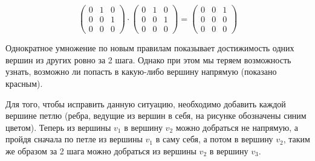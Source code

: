 \documentclass[russian]{lecture-notes}
\begin{document}
$$\begin{pmatrix}
  0 & 1 & 0\\
  0 & 0 & 1\\
  0 & 0 & 0
\end{pmatrix}
\cdot
\begin{pmatrix}
  0 & 1 & 0\\
  0 & 0 & 1\\
  0 & 0 & 0
\end{pmatrix}
=
\begin{pmatrix}
  0 & 0 & 1\\
  0 & 0 & 0\\
  0 & 0 & 0
\end{pmatrix}
$$

\begin{figure}[H]
    \centering
\end{figure}

Однократное умножение по новым правилам показывает достижимость одних вершин из других ровно за 2 шага.  Однако при этом мы теряем возможность узнать, возможно ли попасть в какую-либо вершину напрямую (показано красным).

Для того, чтобы исправить данную ситуацию, необходимо добавить каждой вершине петлю (ребра, ведущие из вершин в себя, на рисунке обозначены синим цветом). Теперь из вершины $v_1$ в вершину $v_2$ можно добраться не напрямую, а  пройдя сначала по петле из вершины $v_1$ в саму себя, а потом в вершину $v_2$, таким же образом за 2 шага можно добраться из вершины $v_2$ в вершину $v_3$.
\end{document}
